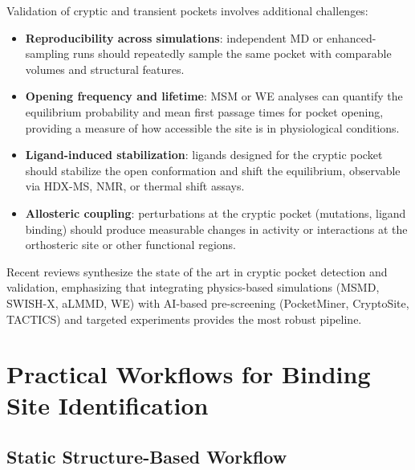 \documentclass[12pt,a4paper]{article}
\begin{document}
Validation of cryptic and transient pockets involves additional challenges:\cite{CH5_Kuzmanic2020,CH5_zhang2026decrypting}
\begin{itemize}
    \item \textbf{Reproducibility across simulations}: independent MD or enhanced-sampling runs should repeatedly sample the same pocket with comparable volumes and structural features.
    \item \textbf{Opening frequency and lifetime}: MSM or WE analyses can quantify the equilibrium probability and mean first passage times for pocket opening, providing a measure of how accessible the site is in physiological conditions.
    \item \textbf{Ligand-induced stabilization}: ligands designed for the cryptic pocket should stabilize the open conformation and shift the equilibrium, observable via HDX-MS, NMR, or thermal shift assays.
    \item \textbf{Allosteric coupling}: perturbations at the cryptic pocket (mutations, ligand binding) should produce measurable changes in activity or interactions at the orthosteric site or other functional regions.\cite{CH5_Gasparikova2025}
\end{itemize}

Recent reviews synthesize the state of the art in cryptic pocket detection and validation, emphasizing that integrating physics-based simulations (MSMD, SWISH-X, aLMMD, WE) with AI-based pre-screening (PocketMiner, CryptoSite, TACTICS) and targeted experiments provides the most robust pipeline.\cite{CH5_Kuzmanic2020,CH5_Gasparikova2025,CH5_zhang2026decrypting}

\section{Practical Workflows for Binding Site Identification}

\subsection{Static Structure-Based Workflow}
\end{document}
